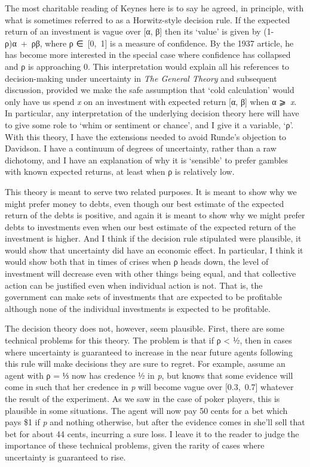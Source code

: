 \documentclass[
  10pt,
  letterpaper,
  DIV=11,
  numbers=noendperiod,
  twoside]{scrartcl}
\begin{document}
The most charitable reading of Keynes here is to say he agreed, in
principle, with what is sometimes referred to as a Horwitz-style
decision rule. If the expected return of an investment is vague over
{[}α, β{]} then its `value' is given by (1-ρ)α~+~ρβ, where ρ
∈~{[}0,~1{]} is a measure of confidence. By the 1937 article, he has
become more interested in the special case where confidence has
collapsed and ρ is approaching 0. This interpretation would explain all
his references to decision-making under uncertainty in \emph{The General
Theory} and subsequent discussion, provided we make the safe assumption
that `cold calculation' would only have us spend \emph{x} on an
investment with expected return {[}α, β{]} when α ⩾~\emph{x}. In
particular, any interpretation of the underlying decision theory here
will have to give some role to `whim or sentiment or chance', and I give
it a variable, `ρ'. With this theory, I have the extensions needed to
avoid Runde's objection to Davidson. I have a continuum of degrees of
uncertainty, rather than a raw dichotomy, and I have an explanation of
why it is `sensible' to prefer gambles with known expected returns, at
least when ρ is relatively low.

This theory is meant to serve two related purposes. It is meant to show
why we might prefer money to debts, even though our best estimate of the
expected return of the debts is positive, and again it is meant to show
why we might prefer debts to investments even when our best estimate of
the expected return of the investment is higher. And I think if the
decision rule stipulated were plausible, it would show that uncertainty
did have an economic effect. In particular, I think it would show both
that in times of crises when ρ heads down, the level of investment will
decrease even with other things being equal, and that collective action
can be justified even when individual action is not. That is, the
government can make sets of investments that are expected to be
profitable although none of the individual investments is expected to be
profitable.

The decision theory does not, however, seem plausible. First, there are
some technical problems for this theory. The problem is that if ρ
\textless{} ½, then in cases where uncertainty is guaranteed to increase
in the near future agents following this rule will make decisions they
are sure to regret. For example, assume an agent with ρ = ⅓ now has
credence ½ in \emph{p}, but knows that some evidence will come in such
that her credence in \emph{p} will become vague over {[}0.3,~0.7{]}
whatever the result of the experiment. As we saw in the case of poker
players, this is plausible in some situations. The agent will now pay 50
cents for a bet which pays \$1 if \emph{p} and nothing otherwise, but
after the evidence comes in she'll sell that bet for about 44 cents,
incurring a sure loss. I leave it to the reader to judge the importance
of these technical problems, given the rarity of cases where uncertainty
is guaranteed to rise.
\end{document}
